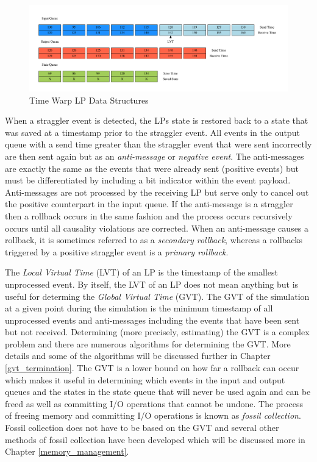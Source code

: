 \documentclass[11pt]{book}
\begin{document}
\begin{figure}
    \centering
    \includegraphics[width=\textwidth,quiet]{figs/graphviz/logical_process.pdf}
    \caption{Time Warp LP Data Structures}\label{lp_data_structures}
\end{figure}

When a straggler event is detected, the LPs state is restored back to a state that was saved at a
timestamp prior to the straggler event.  All events in the output queue with a send time greater
than the straggler event that were sent incorrectly are then sent again but as an
\emph{anti-message} or \emph{negative event}.  The anti-messages are exactly the same as the events
that were already sent (positive events) but must be differentiated by including a bit indicator
within the event payload.  Anti-messages are not processed by the receiving LP but serve only to
cancel out the positive counterpart in the input queue.  If the anti-message is a straggler then a
rollback occurs in the same fashion and the process occurs recursively occurs until all causality
violations are corrected.  When an anti-message causes a rollback, it is sometimes referred to as a
\emph{secondary rollback}, whereas a rollbacks triggered by a positive straggler event is a
\emph{primary rollback}.

The \emph{Local Virtual Time} (LVT) of an LP is the timestamp of the smallest unprocessed event.  By
itself, the LVT of an LP does not mean anything but is useful for determing the \emph{Global Virtual
  Time} (GVT).  The GVT of the simulation at a given point during the simulation is the minimum
timestamp of all unprocessed events and anti-messages including the events that have been sent but
not received\cite{fujimoto-94}.  Determining (more precisely, estimating) the GVT is a complex
problem and there are numerous algorithms for determining the GVT. More details and some of the
algorithms will be discussed further in Chapter \ref{gvt_termination}.  The GVT is a lower bound on
how far a rollback can occur which makes it useful in determining which events in the input and
output queues and the states in the state queue that will never be used again and can be freed as
well as committing I/O operations that cannot be undone.  The process of freeing memory and
committing I/O operations is known as \emph{fossil collection}.  Fossil collection does not have to
be based on the GVT and several other methods of fossil collection have been developed which will be
discussed more in Chapter \ref{memory_management}.
\end{document}
